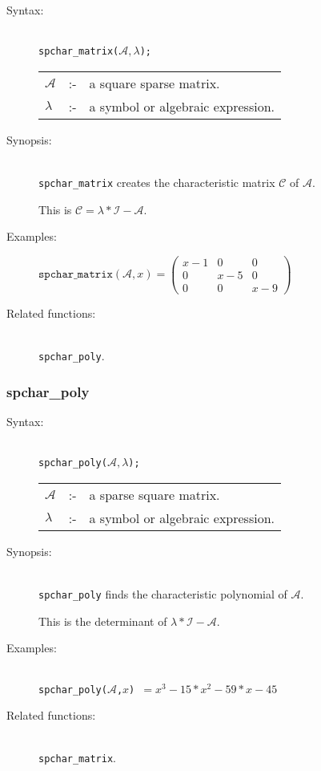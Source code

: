 \begin{description}
\item[Syntax:]\mbox{}\\
\texttt{spchar\_matrix($\mathcal{A},\lambda$);}\\[2mm]
\begin{tabular}{l l l}
$\mathcal{A}$ &:-& a square sparse matrix. \\
$\lambda$  &:-& a symbol or algebraic expression. 
\end{tabular}

\item[Synopsis:]\mbox{}\\
\texttt{spchar\_matrix} creates the characteristic matrix $\mathcal{C}$ of 
$\mathcal{A}$.

This is $\mathcal{C} = \lambda * \mathcal{I} - \mathcal{A}$. 

\item[Examples:]
\begin{flushleft}  
\begin{math}  
\texttt{spchar\_matrix}(\mathcal{A},x) = 
\begin{pmatrix} x-1 & 0 & 0 \\ 0 & x-5 & 0 \\ 0 & 0 & x-9 \end{pmatrix} 
\end{math}  
\end{flushleft}

\item[Related functions:]\mbox{}\\
\texttt{spchar\_poly}. 
\end{description}

\subsubsection{spchar\_poly}
\label{sparse:spchar_poly}

\begin{description}
\item[Syntax:]\mbox{}\\
\texttt{spchar\_poly($\mathcal{A},\lambda$);}\\[2mm]
\begin{tabular}{l l l}
$\mathcal{A}$ &:-& a sparse square matrix. \\
$\lambda$ &:-& a symbol or algebraic expression.
\end{tabular}

\item[Synopsis:]\mbox{}\\
\texttt{spchar\_poly} finds the characteristic polynomial of
                $\mathcal{A}$.  

This is the determinant of $\lambda * \mathcal{I} - \mathcal{A}$.

\item[Examples:]\mbox{}\\
\texttt{spchar\_poly($\mathcal{A}$,$x$) $= x^3-15*x^2-59*x-45$} 

\item[Related functions:]\mbox{}\\
\texttt{spchar\_matrix}. 
\end{description}

